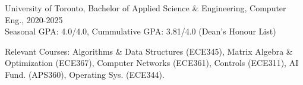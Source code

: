 University of Toronto, Bachelor of Applied Science \& Engineering, Computer Eng., 2020-2025 \\
Seasonal GPA: 4.0/4.0, Cummulative GPA: 3.81/4.0 (Dean’s Honour List) \\
\raggedright{Relevant Courses: Algorithms \& Data Structures (ECE345), Matrix Algebra \& Optimization (ECE367), 
Computer Networks (ECE361), Controls (ECE311), AI Fund. (APS360), Operating Sys. (ECE344).} \\[10pt]
